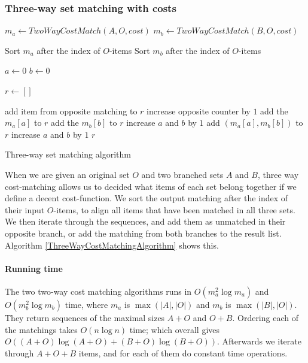 \documentclass[11pt]{article}
\begin{document}
\subsubsection{Three-way set matching with costs}

\begin{algorithm}
\begin{algorithmic}
	\State $m_a\gets TwoWayCostMatch(A, O, cost)$
	\State $m_b\gets TwoWayCostMatch(B, O, cost)$
	
	\State Sort $m_a$ after the index of $O$-items
	\State Sort $m_b$ after the index of $O$-items

	\State $a \gets 0$
	\State $b \gets 0$
	
	\State $r \gets []$
	
			\State add item from opposite matching to $r$
			\State increase opposite counter by $1$
			\State add the $m_a[a]$ to $r$
			\State add the $m_b[b]$ to $r$
			\State increase $a$ and $b$ by $1$
		\Else
			\State add $(m_a[a], m_b[b])$ to $r$
			\State increase $a$ and $b$ by $1$
		\EndIf
	\EndWhile
	\State \Return $r$
\EndFunction
\end{algorithmic}
\caption{Three-way set matching algorithm}
  \label{ThreeWayCostMatchingAlgorithm}
\end{algorithm}

When we are given an original set $O$ and two branched sets $A$ and $B$, three way cost-matching allows us to decided what items of each set belong together if we define a decent cost-function. We sort the output matching after the index of their input $O$-items, to align all items that have been matched in all three sets. We then iterate through the sequences, and add them as unmatched in their opposite branch, or add the matching from both branches to the result list. Algorithm \ref{ThreeWayCostMatchingAlgorithm} shows this.

\paragraph{Running time} The two two-way cost matching algorithms runs in $O(m_{a}^2 \log m_{a})$ and $O(m_{b}^2 \log m_{b})$ time, where $m_{a}$ is $\max(|A|, |O|)$ and $m_{b}$ is $\max(|B|, |O|)$. They return sequences of the maximal sizes $A+O$ and $O+B$. Ordering each of the matchings takes $O(n \log n)$ time; which overall gives $O((A+O) \log (A+O) + (B+O) \log (B+O))$. Afterwards we iterate through $A+O+B$ items, and for each of them do constant time operations.
\end{document}
